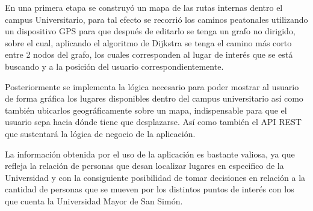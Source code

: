 En una primera etapa se construyó un mapa de las rutas internas dentro el campus Universitario, para tal efecto se recorrió los caminos peatonales utilizando un dispositivo GPS para que después de editarlo se tenga un grafo no dirigido, sobre el cual, aplicando el algoritmo de Dijkstra se tenga el camino más corto entre 2 nodos del grafo, los cuales corresponden al lugar de interés que se está buscando y a la posición del usuario correspondientemente.

Posteriormente se implementa la lógica necesario para poder mostrar al usuario de forma gráfica los lugares disponibles dentro del campus universitario así como también ubicarlos geográficamente sobre un mapa, indispensable para que el usuario sepa hacia dónde tiene que desplazarse. Así como también el API REST que sustentará la lógica de negocio de la aplicación.


La información obtenida por el uso de la aplicación es bastante valiosa, ya que refleja la relación de personas que desan localizar lugares en especifico de la Universidad y con la consiguiente posibilidad de tomar decisiones en relación a la cantidad de personas que se mueven por los distintos puntos de interés con los que cuenta la Universidad Mayor de San Simón.
